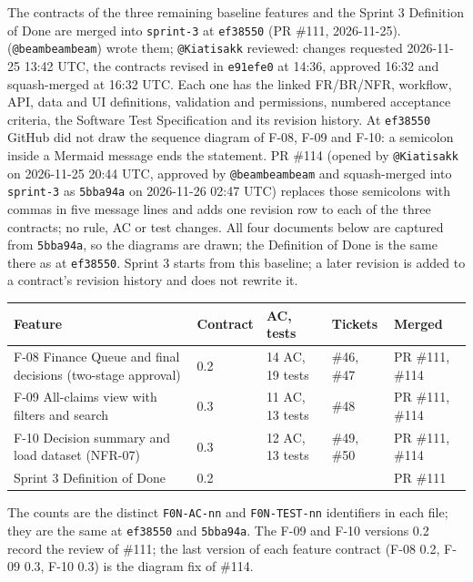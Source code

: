 \label{C:1}

The contracts of the three remaining baseline features and the Sprint 3 Definition of Done are merged into \texttt{sprint-3} at \texttt{ef38550} (PR \#111, 2026-11-25). \studentTwoName{} (\texttt{@beambeambeam}) wrote them; \texttt{@Kiatisakk} reviewed: changes requested 2026-11-25 13:42 UTC, the contracts revised in \texttt{e91efe0} at 14:36, approved 16:32 and squash-merged at 16:32 UTC. Each one has the linked FR/BR/NFR, workflow, API, data and UI definitions, validation and permissions, numbered acceptance criteria, the Software Test Specification and its revision history. At \texttt{ef38550} GitHub did not draw the sequence diagram of F-08, F-09 and F-10: a semicolon inside a Mermaid message ends the statement. PR \#114 (opened by \texttt{@Kiatisakk} on 2026-11-25 20:44 UTC, approved by \texttt{@beambeambeam} and squash-merged into \texttt{sprint-3} as \texttt{5bba94a} on 2026-11-26 02:47 UTC) replaces those semicolons with commas in five message lines and adds one revision row to each of the three contracts; no rule, AC or test changes. All four documents below are captured from \texttt{5bba94a}, so the diagrams are drawn; the Definition of Done is the same there as at \texttt{ef38550}. Sprint 3 starts from this baseline; a later revision is added to a contract's revision history and does not rewrite it.

\begin{center}\small\setlength{\tabcolsep}{4pt}
\begin{tabular}{@{}p{5.8cm}p{1.6cm}p{2.6cm}p{2.2cm}p{2.4cm}@{}}
\toprule \textbf{Feature} & \textbf{Contract} & \textbf{AC, tests} & \textbf{Tickets} & \textbf{Merged} \\ \midrule
F-08 Finance Queue and final decisions (two-stage approval) & 0.2 & 14 AC, 19 tests & \#46, \#47 & PR \#111, \#114 \\
F-09 All-claims view with filters and search & 0.3 & 11 AC, 13 tests & \#48 & PR \#111, \#114 \\
F-10 Decision summary and load dataset (NFR-07) & 0.3 & 12 AC, 13 tests & \#49, \#50 & PR \#111, \#114 \\
Sprint 3 Definition of Done & 0.2 & & & PR \#111 \\
\bottomrule
\end{tabular}
\end{center}

The counts are the distinct \texttt{F0N-AC-nn} and \texttt{F0N-TEST-nn} identifiers in each file; they are the same at \texttt{ef38550} and \texttt{5bba94a}. The F-09 and F-10 versions 0.2 record the review of \#111; the last version of each feature contract (F-08 0.2, F-09 0.3, F-10 0.3) is the diagram fix of \#114.

